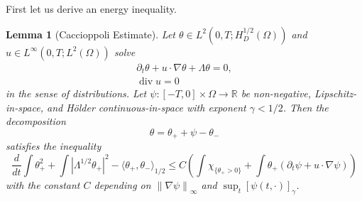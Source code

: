 \documentclass[11pt]{amsart}
\newtheorem{lemma}[theorem]{Lemma}
\theoremstyle{remark}
\theoremstyle{definition}
\newcommand{\R}{\mathbb{R}}
\newcommand{\chevron}[1]{\langle #1 \rangle}
\newcommand{\norm}[1]{\left\lVert#1\right\rVert}
\newcommand{\paren}[1]{\left( #1 \right)}
\newcommand{\bracket}[1]{\left[ #1 \right]}
\newcommand{\abs}[1]{\left\lvert #1 \right\rvert}
\newcommand{\del}{\partial}
\newcommand{\grad}{\nabla}
\newcommand{\ddt}{\frac{d}{dt}}
\renewcommand{\div}{\operatorname{div}}
\newcommand{\indic}[1]{\chi_{\{#1\}}}
\begin{document}
First let us derive an energy inequality.  

\begin{lemma}[Caccioppoli Estimate] \label{thm:caccioppoli}
Let $\theta \in L^2(0,T; H_D^{1/2}(\Omega))$ and $u \in L^\infty(0,T; L^2(\Omega))$ solve
\begin{align*}
\del_t \theta + u\cdot \grad \theta + \Lambda \theta = 0,
\\ \div u = 0
\end{align*}
in the sense of distributions.  Let $\psi: [-T,0]\times \Omega \to \R$ be non-negative, Lipschitz-in-space, and H\"{o}lder continuous-in-space with exponent $\gamma < 1/2$.  Then the decomposition
\[ \theta = \theta_+ + \psi - \theta_- \]
satisfies the inequality
\[ \ddt \int \theta_+^2 + \int \abs{\Lambda^{1/2} \theta_+}^2 - \chevron{\theta_+,\theta_-}_{1/2} \leq C \paren{ \int \indic{\theta_+ > 0} + \int \theta_+ (\del_t \psi + u\cdot\grad\psi) } \]
with the constant $C$ depending on $\norm{\grad \psi}_\infty$ and $\sup_t \bracket{\psi(t,\cdot)}_\gamma$.  

\end{lemma}
\end{document}
